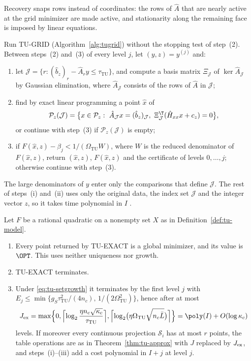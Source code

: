 Recovery snaps rows instead of coordinates: the rows of $\hat A$ that are
nearly active at the grid minimizer are made active, and stationarity along
the remaining face is imposed by linear equations.

\begin{algorithm}\label{alg:tuexact}
Run TU-GRID (Algorithm~\ref{alg:tugrid}) without the stopping test of
step~(2). Between steps~(2) and~(3) of every level $j$, let $(y,z)=y^{(j)}$
and:
\begin{enumerate}[label=(\roman*)]
\item let $\mathcal J=\{r:(\hat b_z)_r-\hat A_ry\le\tau_{\mathrm{TU}}\}$, and
compute a basis matrix $\Xi_{\mathcal J}$ of $\ker\hat A_{\mathcal J}$ by
Gaussian elimination, where $\hat A_{\mathcal J}$ consists of the rows of
$\hat A$ in $\mathcal J$;
\item find by exact linear programming a point $\hat x$ of
\[
\mathcal P_z(\mathcal J)=\bigl\{x\in\mathcal P_z:\
\hat A_{\mathcal J}x=(\hat b_z)_{\mathcal J},\
\Xi_{\mathcal J}^{\T}(\hat H_{xx}x+c_z)=0\bigr\},
\]
or continue with step~(3) if $\mathcal P_z(\mathcal J)$ is empty;
\item if $F(\hat x,z)-\beta_j<1/(\Omega_{\mathrm{TU}}W)$, where $W$ is the
reduced denominator of $F(\hat x,z)$, return $(\hat x,z)$, $F(\hat x,z)$ and
the certificate of levels $0,\dots,j$; otherwise continue with step~(3).
\end{enumerate}
\end{algorithm}

The large denominators of $y$ enter only the comparisons that define
$\mathcal J$. The rest of steps~(i) and~(ii) uses only the original data,
the index set $\mathcal J$ and the integer vector $z$, so it takes time
polynomial in $I$ \cite[Theorem~6.4.12]{GrotschelLovaszSchrijver1988}.

\begin{theorem}[Exact output with TU coupling]\label{thm:tu-exact}
Let $F$ be a rational quadratic on a nonempty set $X$ as in
Definition~\ref{def:tu-model}.
\begin{enumerate}[label=(\alph*)]
\item Every point returned by TU-EXACT is a global minimizer, and its value
is $\OPT$. This uses neither uniqueness nor growth.
\item TU-EXACT terminates.
\item Under \eqref{eq:tu-setgrowth} it terminates by the first level $j$ with
$E_j\le\min\{g_S\tau_{\mathrm{TU}}^2/(4n_c),\,1/(2\Omega_{\mathrm{TU}}^2)\}$,
hence after at most
\[
J_{\rm ex}=\max\Bigl\{0,\Bigl\lceil\log_2\frac{\eta n_c\sqrt{\kappa_c}}{\tau_{\mathrm{TU}}}\Bigr\rceil,
\Bigl\lceil\log_2\bigl(\eta\Omega_{\mathrm{TU}}\sqrt{n_c\bar L}\bigr)\Bigr\rceil\Bigr\}
=\poly(I)+O(\log\kappa_c)
\]
levels. If moreover every continuous projection $\mathcal S_i$ has at most
$r$ points, the table operations are as in Theorem~\ref{thm:tu-approx} with
$J$ replaced by $J_{\rm ex}$, and steps~(i)--(iii) add a cost polynomial in
$I+j$ at level $j$.
\end{enumerate}
\end{theorem}

